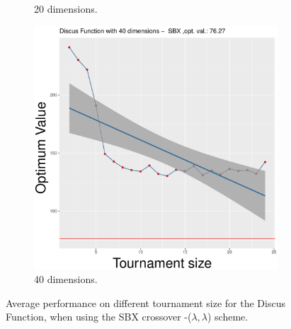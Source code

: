 \begin{figure}[t]
\begin{subfigure}[b]{0.33\textwidth}
		\caption{20 dimensions.}
	\end{subfigure}
	\begin{subfigure}[b]{0.33\textwidth}
		\centering
		\includegraphics[width=\textwidth]{img/SBX-40D/unimodal_sbx_11_dim_40.pdf}
		\caption{40 dimensions.}
	\end{subfigure}
	\caption{Average performance on different tournament size for the Discus Function, when using the SBX crossover -($\lambda, \lambda$) scheme.}
	\label{sbx-11}
\end{figure}


